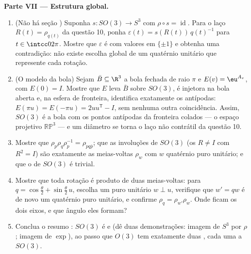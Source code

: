\begin{problem}
\medskip
\noindent\textbf{Parte VII --- Estrutura global.}
\begin{enumerate}[resume]
  \item (Não há seção ) Suponha $s \colon SO(3) \to
        S^3$  com $\rho \circ s =
        \operatorname{id}$. Para o
        laço $R(t) =
        \rho_{q(t)}$ da questão 10, ponha $\varepsilon(t) =
        s(R(t))\,q(t)^{-1}$ para $t \in \intcc0{2\pi}$. Mostre que
        $\varepsilon$ é  com valores em $\{\pm1\}$ e obtenha uma contradição:
        não existe escolha global  de um quatérnio unitário que
        represente cada rotação.
  \item (O modelo da bola) Sejam $\bar B \subseteq \R^3$ a bola fechada de raio
        $\pi$ e $E(v) = \eu^{A_v}$, com $E(0) = I$. Mostre que $E$ leva $\bar B$
        sobre $SO(3)$, é injetora na bola aberta e, na esfera de
        fronteira, identifica exatamente os antípodas: $E(\pi u) = E(-\pi u) = 2uu^{\mathsf T} - I$, sem
        nenhuma outra coincidência. Assim, $SO(3)$ é a bola com os
        pontos antípodas da fronteira colados --- o espaço projetivo
        $\mathbb{RP}^3$ --- e um diâmetro se torna o laço não contrátil da questão
        10.
  \item Mostre que $\rho_p\rho_q\rho_p^{-1} = \rho_{pq\bar
        p}$; que as involuções de $SO(3)$ (os $R \neq
        I$ com
        $R^2 = I$) são exatamente as meias-voltas $\rho_w$ com $w$
        quatérnio puro unitário; e que o  de $SO(3)$ é trivial.
  \item Mostre que toda rotação é produto de duas meias-voltas: para
        $q = \cos\frac\theta2 +
        \sin\frac\theta2\,u$, escolha um puro unitário $w \perp
        u$, verifique que $w' = qw$ é de
        novo um quatérnio puro unitário, e confirme $\rho_q =
        \rho_{w'}\rho_w$. Onde ficam os
        dois eixos, e que ângulo eles formam?
  \item Conclua o resumo : $SO(3)$ é  e  (dê duas demonstrações: imagem  de $S^3$ por
        $\rho$; imagem de $\exp$), ao passo que $O(3)$ tem
        exatamente duas , cada uma  a
        $SO(3)$.


\end{enumerate}
\end{problem}
